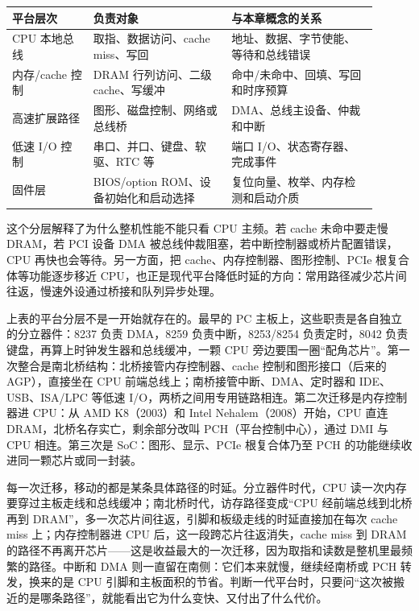 \begin{longtable}{L{0.2\linewidth}L{0.34\linewidth}L{0.36\linewidth}}
\toprule
平台层次 & 负责对象 & 与本章概念的关系 \\
\midrule
CPU 本地总线 & 取指、数据访问、cache miss、写回 & 地址、数据、字节使能、等待和总线错误 \\\tablerowrule
内存/cache 控制 & DRAM 行列访问、二级 cache、写缓冲 & 命中/未命中、回填、写回和时序预算 \\\tablerowrule
高速扩展路径 & 图形、磁盘控制、网络或总线桥 & DMA、总线主设备、仲裁和中断 \\\tablerowrule
低速 I/O 控制 & 串口、并口、键盘、软驱、RTC 等 & 端口 I/O、状态寄存器、完成事件 \\\tablerowrule
固件层 & BIOS/option ROM、设备初始化和启动选择 & 复位向量、枚举、内存检测和启动介质 \\
\bottomrule
\end{longtable}

这个分层解释了为什么整机性能不能只看 CPU 主频。若 cache 未命中要走慢 DRAM，若 PCI 设备 DMA 被总线仲裁阻塞，若中断控制器或桥片配置错误，CPU 再快也会等待。另一方面，把 cache、内存控制器、图形控制、PCIe 根复合体等功能逐步移近 CPU，也正是现代平台降低时延的方向：常用路径减少芯片间往返，慢速外设通过桥接和队列异步处理。

上表的平台分层不是一开始就存在的。最早的 PC 主板上，这些职责是各自独立的分立器件：8237 负责 DMA，8259 负责中断，8253/8254 负责定时，8042 负责键盘，再算上时钟发生器和总线缓冲，一颗 CPU 旁边要围一圈“配角芯片”。第一次整合是南北桥结构：北桥接管内存控制器、cache 控制和图形接口（后来的 AGP），直接坐在 CPU 前端总线上；南桥接管中断、DMA、定时器和 IDE、USB、ISA/LPC 等低速 I/O，两桥之间用专用链路相连。第二次迁移是内存控制器进 CPU：从 AMD K8（2003）和 Intel Nehalem（2008）开始，CPU 直连 DRAM，北桥名存实亡，剩余部分改叫 PCH（平台控制中心），通过 DMI 与 CPU 相连。第三次是 SoC：图形、显示、PCIe 根复合体乃至 PCH 的功能继续收进同一颗芯片或同一封装。

每一次迁移，移动的都是某条具体路径的时延。分立器件时代，CPU 读一次内存要穿过主板走线和总线缓冲；南北桥时代，访存路径变成“CPU 经前端总线到北桥再到 DRAM”，多一次芯片间往返，引脚和板级走线的时延直接加在每次 cache miss 上；内存控制器进 CPU 后，这一段跨芯片往返消失，cache miss 到 DRAM 的路径不再离开芯片——这是收益最大的一次迁移，因为取指和读数是整机里最频繁的路径。中断和 DMA 则一直留在南侧：它们本来就慢，继续经南桥或 PCH 转发，换来的是 CPU 引脚和主板面积的节省。判断一代平台时，只要问“这次被搬近的是哪条路径”，就能看出它为什么变快、又付出了什么代价。

